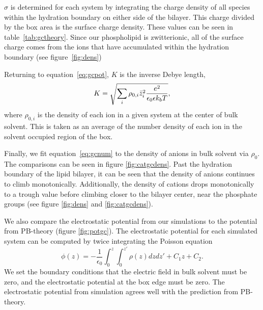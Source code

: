 \documentclass[journal=langd5,manuscript=article]{achemso}
\begin{document}
$\sigma$ is determined for
each system by integrating the charge density of all species within the hydration boundary on either side of the bilayer.
This charge divided by the box area is the surface charge density.
These values can be seen in table~\ref{tab:gctheory}. {Since our
    phospholipid is zwitterionic, all of the surface charge comes from the
ions that have accumulated within 
the hydration boundary (see figure~\ref{fig:dens})}

Returning to equation~\ref{eq:gcpot}, $K$ is the inverse Debye length,
\begin{equation}
K=\sqrt{\sum_{i} \rho_{0,i} \bar z_i^2\frac{\text{\si{\elementarycharge}}^2}{\epsilon_0 \epsilon k_bT}},
\label{eq:debyelength}
\end{equation}
where $\rho_{0,i}$ is the density of each ion in a given system at the center of bulk solvent.
This is taken as an average of the number density of each ion in the solvent occupied region of the box.

Finally, we fit equation~\ref{eq:gcnum} to the density of anions in 
bulk solvent via $\rho_0$. The comparisons
can be seen in figure \ref{fig:catgcdens}.
Past the hydration boundary of the lipid bilayer, it can be seen that the density of anions continues 
to climb monotonically. Additionally, the density of cations 
drops monotonically to a trough value before climbing closer to the bilayer center, near the phosphate groups 
(see figure \ref{fig:dens} and \ref{fig:catgcdens}). 


We also compare {the} 
electrostatic potential from our simulations 
to the potential from PB-theory 
(figure \ref{fig:potgc}). 
The electrostatic potential for each simulated system can be computed 
by twice integrating the Poisson equation 
\begin{equation}
    \phi(z)=-\frac{1}{\epsilon_0}\int_{0}^{z}\int_{0}^{z'}\rho(z) dz dz' + C_1z + C_2\text{.}
    \label{eq:poissonint}
\end{equation}
We set the boundary conditions that
the electric field in bulk solvent must be zero, and the electrostatic potential at the box edge must be zero.
The electrostatic potential from simulation agrees well with the prediction from PB-theory.
\end{document}
